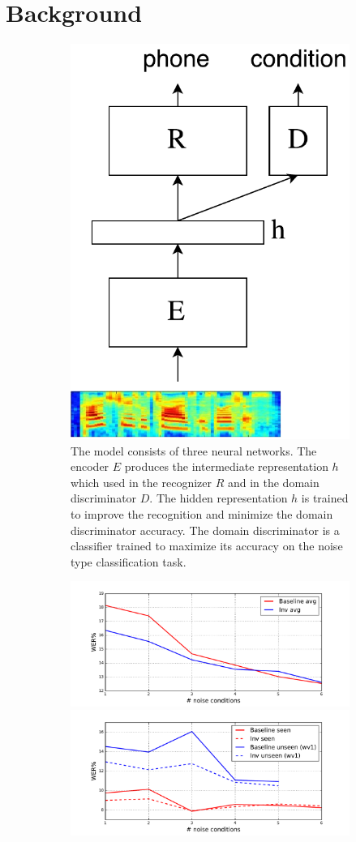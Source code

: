 \documentclass[a4paper]{article}
\begin{document}
\section{Background}
\label{sec:background}
\begin{figure}
    \centering

    \begin{subfigure}[b]{0.49\linewidth}
    \centering
        \includegraphics[width=0.4\linewidth]{model.pdf}
        \caption{The model consists of three neural networks. The encoder $E$ produces
        the intermediate representation $h$ which used in the recognizer $R$ and 
        in the domain discriminator $D$. The hidden representation $h$ is trained to improve
        the recognition and minimize the domain discriminator accuracy. The domain discriminator
        is a classifier trained to maximize its accuracy on the noise type
        classification task.}
        \label{fig:model}
    \end{subfigure}
    \begin{subfigure}[b]{0.5\linewidth}
        \centering
        \includegraphics[width=0.7\linewidth]{wer_avg.pdf}
        \includegraphics[width=0.7\linewidth]{wer_seen_unseen.pdf}

\end{subfigure}
\end{figure}
\end{document}
